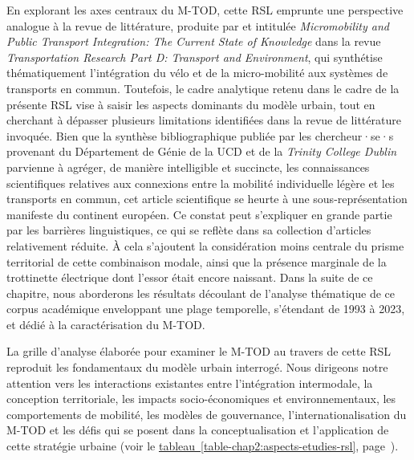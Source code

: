 \begin{refsegment}
En explorant les axes centraux du \acrshort{M-TOD}, cette \acrshort{RSL} emprunte une perspective analogue à la revue de littérature, produite par \textcolor{blue}{\textcite[5]{oeschger_micromobility_2020}} et intitulée \foreignlanguage{english}{\textsl{Micromobility and Public Transport Integration: The Current State of Knowledge}} dans la revue \foreignlanguage{english}{\textsl{Transportation Research Part D: Transport and Environment}}, qui synthétise thématiquement l'intégration du vélo et de la micro-mobilité aux systèmes de transports en commun. Toutefois, le cadre analytique retenu dans le cadre de la présente \acrshort{RSL} vise à saisir les aspects dominants du modèle urbain, tout en cherchant à dépasser plusieurs limitations identifiées dans la revue de littérature invoquée. Bien que la synthèse bibliographique publiée par les chercheur·se·s provenant du Département de Génie de la \acrfull{UCD} et de la \textsl{Trinity College Dublin} parvienne à agréger, de manière intelligible et succincte, les connaissances scientifiques relatives aux connexions entre la mobilité individuelle légère et les transports en commun, cet article scientifique se heurte à une sous-représentation manifeste du continent européen. Ce constat peut s'expliquer en grande partie par les barrières linguistiques, ce qui se reflète dans sa collection d'articles relativement réduite. À cela s'ajoutent la considération moins centrale du prisme territorial de cette combinaison modale, ainsi que la présence marginale de la trottinette électrique dont l'essor était encore naissant. Dans la suite de ce chapitre, nous aborderons les résultats découlant de l'analyse thématique de ce corpus académique enveloppant une plage temporelle, s'étendant de 1993 à 2023, et dédié à la caractérisation du \acrshort{M-TOD}.%

La grille d'analyse élaborée pour examiner le \acrshort{M-TOD} au travers de cette \acrshort{RSL} reproduit les fondamentaux du modèle urbain interrogé. Nous dirigeons notre attention vers les interactions existantes entre l'intégration intermodale, la conception territoriale, les impacts socio-économiques et environnementaux, les comportements de mobilité, les modèles de gouvernance, l'internationalisation du \acrshort{M-TOD} et les défis qui se posent dans la conceptualisation et l'application de cette stratégie urbaine (voir le \hyperref[table-chap2:aspects-etudies-rsl]{tableau~\ref{table-chap2:aspects-etudies-rsl}}, page~\pageref{table-chap2:aspects-etudies-rsl}).%


\end{refsegment}
